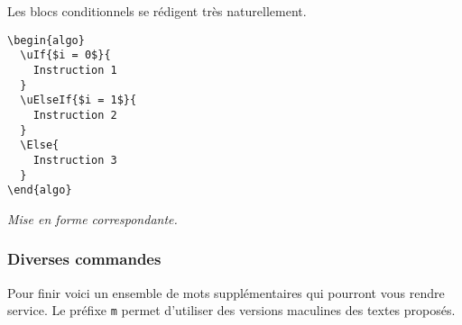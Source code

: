 \documentclass[12pt,a4paper]{article}
\theoremstyle{definition}
\newenvironment{frame-gene}[1][]{
	\begin{tcolorbox}[
		title        = #1, 
		colbacktitle = black!10!white, 
		colback      = white, 
		coltitle     = black,
		fonttitle    = \bfseries\itshape\small, 
		breakable,
		center title]
}{
	\end{tcolorbox}
}
\begin{document}
Les blocs conditionnels \TTif{} se rédigent très naturellement.


\begin{multicols}{2}
    \centering
    \begin{frame-gene}
\begin{verbatim}
\begin{algo}
  \uIf{$i = 0$}{
    Instruction 1
  }
  \uElseIf{$i = 1$}{
    Instruction 2
  }
  \Else{
    Instruction 3
  }
\end{algo}
\end{verbatim}
    \end{frame-gene}
    \vfill\null
    \columnbreak
    \textit{Mise en forme correspondante.}
\begin{algo}
\end{algo}
    \vfill\null
\end{multicols}


\subsubsection{Diverses commandes}

Pour finir voici un ensemble de mots supplémentaires qui pourront vous rendre service. Le préfixe \verb+m+ permet d'utiliser des versions maculines des textes proposés.
\end{document}
